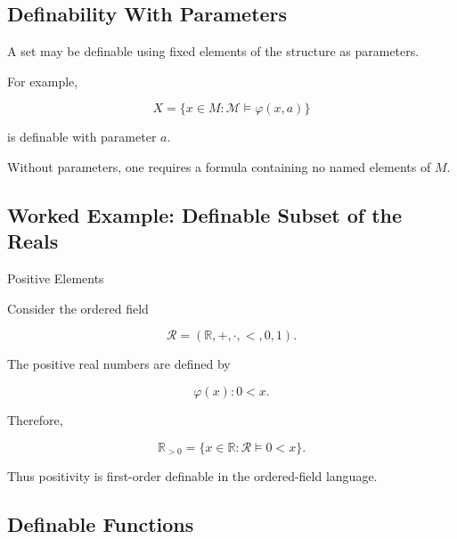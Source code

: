 \subsection{Definability With Parameters}
\label{subsec:definability-with-parameters}

A set may be definable using fixed elements of the structure as parameters.

For example,

\[
X
=
\{
x\in M:
\mathcal{M}\models
\varphi(x,a)
\}
\]

is definable with parameter \(a\).

Without parameters, one requires a formula containing no named elements of
\(M\).

\subsection{Worked Example: Definable Subset of the Reals}
\label{subsec:worked-definable-set}

\begin{workedexamplebox}{Positive Elements}

Consider the ordered field

\[
\mathcal{R}
=
(\mathbb{R},+,\cdot,<,0,1).
\]

The positive real numbers are defined by

\[
\varphi(x)
:
0<x.
\]

Therefore,

\begin{answerbox}
\[
\boxed{
\mathbb{R}_{>0}
=
\{
x\in\mathbb{R}:
\mathcal{R}\models0<x
\}.
}
\]
\end{answerbox}

Thus positivity is first-order definable in the ordered-field language.

\end{workedexamplebox}

\subsection{Definable Functions}
\label{subsec:model-theoretic-definable-functions}


